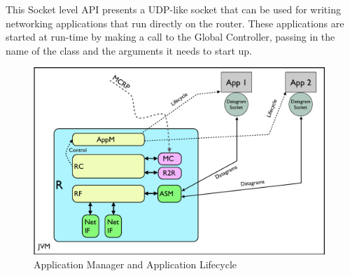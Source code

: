 This Socket level API presents a UDP-like socket that can be used for
writing networking applications that run directly on the router.
These applications are started at run-time by making a call to the
Global Controller, passing in the name of the class and the arguments
it needs to start up.


\begin{figure}[h!]
    \centering
    \includegraphics[width=11cm]{images/app-manager}
    \caption{Application Manager and Application Lifecycle}
    \label{design:app-manager}
\end{figure}



